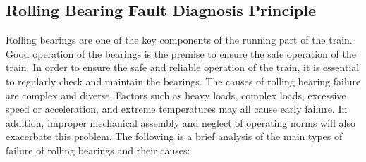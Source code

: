 \documentclass{article}
\begin{document}
\subsection{Rolling Bearing Fault Diagnosis Principle}
Rolling bearings are one of the key components of the running part of the train. Good operation of the bearings is the premise to ensure the safe operation of the train. In order to ensure the safe and reliable operation of the train, it is essential to regularly check and maintain the bearings.
The causes of rolling bearing failure are complex and diverse. Factors such as heavy loads, complex loads, excessive speed or acceleration, and extreme temperatures may all cause early failure. In addition, improper mechanical assembly and neglect of operating norms will also exacerbate this problem. The following is a brief analysis of the main types of failure of rolling bearings and their causes:
\end{document}
